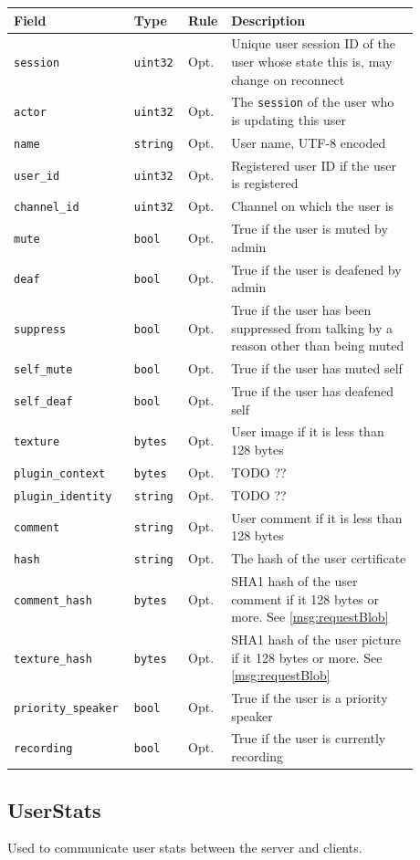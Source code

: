 \documentclass[11pt]{article} %
\newenvironment{mumbleMessageEx}
{%
	\small
	\renewcommand\arraystretch{1.5}
	\begin{tabular}{p{0.25\linewidth}p{0.13\linewidth}p{0.05\linewidth}p{0.45\linewidth}}
	Field & Type & Rule & Description \\
	\hline
}
{%
	\end{tabular}
	\renewcommand\arraystretch{1.0}
}
\newcommand{\mumbleMessageExItem}[4]{ \texttt{#1} & \texttt{#2} & #3 & #4 \\ }
\begin{document}
\begin{mumbleMessageEx}
\mumbleMessageExItem{session}{uint32}{Opt.}{Unique user session ID of the user whose state this is, may change on reconnect}
\mumbleMessageExItem{actor}{uint32}{Opt.}{The \texttt{session} of the user who is updating this user}
\mumbleMessageExItem{name}{string}{Opt.}{User name, UTF-8 encoded}
\mumbleMessageExItem{user\_id}{uint32}{Opt.}{Registered user ID if the user is registered}
\mumbleMessageExItem{channel\_id}{uint32}{Opt.}{Channel on which the user is}
\mumbleMessageExItem{mute}{bool}{Opt.}{True if the user is muted by admin}
\mumbleMessageExItem{deaf}{bool}{Opt.}{True if the user is deafened by admin}
\mumbleMessageExItem{suppress}{bool}{Opt.}{True if the user has been suppressed from talking by a reason other than being muted}
\mumbleMessageExItem{self\_mute}{bool}{Opt.}{True if the user has muted self}
\mumbleMessageExItem{self\_deaf}{bool}{Opt.}{True if the user has deafened self}
\mumbleMessageExItem{texture}{bytes}{Opt.}{User image if it is less than 128 bytes}
\mumbleMessageExItem{plugin\_context}{bytes}{Opt.}{TODO ??}
\mumbleMessageExItem{plugin\_identity}{string}{Opt.}{TODO ??}
\mumbleMessageExItem{comment}{string}{Opt.}{User comment if it is less than 128 bytes}
\mumbleMessageExItem{hash}{string}{Opt.}{The hash of the user certificate}
\mumbleMessageExItem{comment\_hash}{bytes}{Opt.}{SHA1 hash of the user comment if it 128 bytes or more. See \ref{msg:requestBlob}}
\mumbleMessageExItem{texture\_hash}{bytes}{Opt.}{SHA1 hash of the user picture if it 128 bytes or more. See \ref{msg:requestBlob}}
\mumbleMessageExItem{priority\_speaker}{bool}{Opt.}{True if the user is a priority speaker}
\mumbleMessageExItem{recording}{bool}{Opt.}{True if the user is currently recording}
\end{mumbleMessageEx}

\subsection{UserStats}
\label{msg:userStats}

Used to communicate user stats between the server and clients.
\end{document}
